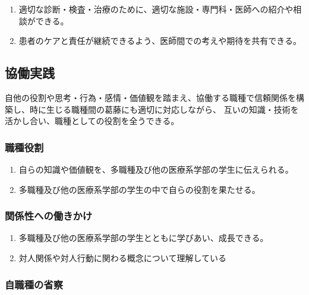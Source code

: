 \begin{enumerate}
\def\labelenumi{\arabic{enumi}.}
\tightlist
\item
  適切な診断・検査・治療のために、適切な施設・専門科・医師への紹介や相談ができる。
\item
  患者のケアと責任が継続できるよう、医師間での考えや期待を共有できる。
\end{enumerate}

\hypertarget{ux5354ux50cdux5b9fux8df5}{%
\subsection{協働実践}\label{ux5354ux50cdux5b9fux8df5}}

自他の役割や思考・行為・感情・価値観を踏まえ、協働する職種で信頼関係を構築し、時に生じる職種間の葛藤にも適切に対応しながら、
互いの知識・技術を活かし合い、職種としての役割を全うできる。

\hypertarget{ux8077ux7a2eux5f79ux5272}{%
\subsubsection{職種役割}\label{ux8077ux7a2eux5f79ux5272}}

\begin{enumerate}
\def\labelenumi{\arabic{enumi}.}
\tightlist
\item
  自らの知識や価値観を、多職種及び他の医療系学部の学生に伝えられる。
\item
  多職種及び他の医療系学部の学生の中で自らの役割を果たせる。
\end{enumerate}

\hypertarget{ux95a2ux4fc2ux6027ux3078ux306eux50cdux304dux304bux3051}{%
\subsubsection{関係性への働きかけ}\label{ux95a2ux4fc2ux6027ux3078ux306eux50cdux304dux304bux3051}}

\begin{enumerate}
\def\labelenumi{\arabic{enumi}.}
\tightlist
\item
  多職種及び他の医療系学部の学生とともに学びあい、成長できる。
\item
  対人関係や対人行動に関わる概念について理解している
\end{enumerate}

\hypertarget{ux81eaux8077ux7a2eux306eux7701ux5bdf}{%
\subsubsection{自職種の省察}\label{ux81eaux8077ux7a2eux306eux7701ux5bdf}}

